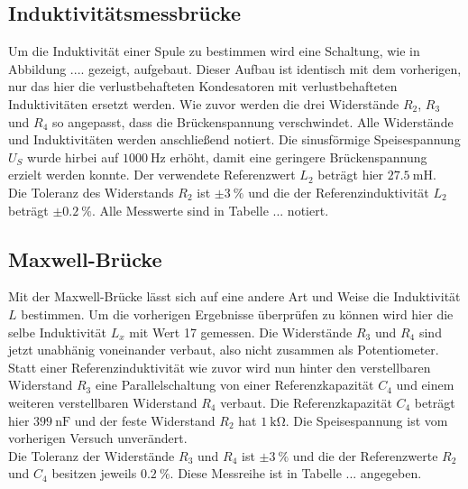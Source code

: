 \subsection{Induktivitätsmessbrücke}
Um die Induktivität einer Spule zu bestimmen wird eine Schaltung, wie in Abbildung .... gezeigt, aufgebaut. Dieser Aufbau ist identisch mit dem vorherigen, nur das hier die verlustbehafteten Kondesatoren mit verlustbehafteten Induktivitäten
ersetzt werden. Wie zuvor werden die drei Widerstände $R_{2}$, $R_{3}$ und $R_{4}$ so angepasst, dass die Brückenspannung verschwindet. Alle Widerstände und Induktivitäten werden anschließend notiert. Die sinusförmige Speisespannung $U_{S}$
wurde hirbei auf $\SI{1000}{\hertz}$ erhöht, damit eine geringere Brückenspannung erzielt werden konnte.
Der verwendete Referenzwert $L_{2}$ beträgt hier $\SI{27.5}{\milli\henry}$. 
\\
\newline
Die Toleranz des Widerstands $R_{2}$ ist $\pm\SI{3}{\percent}$ und die der Referenzinduktivität $L_{2}$ beträgt $\pm\SI{0.2}{\percent}$.
Alle Messwerte sind in Tabelle ... notiert.

\subsection{Maxwell-Brücke}
Mit der Maxwell-Brücke lässt sich auf eine andere Art und Weise die Induktivität $L$ bestimmen. Um die vorherigen Ergebnisse überprüfen zu können wird hier die selbe Induktivität $L_{x}$ mit Wert 17 gemessen. Die Widerstände $R_{3}$ und $R_{4}$ sind
jetzt unabhänig voneinander verbaut, also nicht zusammen als Potentiometer. Statt einer Referenzinduktivität wie zuvor wird nun hinter den verstellbaren Widerstand $R_{3}$ eine Parallelschaltung von einer Referenzkapazität $C_{4}$ und einem 
weiteren verstellbaren Widerstand $R_{4}$ verbaut. Die Referenzkapazität $C_{4}$ beträgt hier $\SI{399}{\nano\farad}$ und der feste Widerstand $R_{2}$ hat $\SI{1}{\kilo\ohm}$. Die Speisespannung ist vom vorherigen Versuch unverändert.
\\
\newline
Die Toleranz der Widerstände $R_{3}$ und $R_{4}$ ist $\pm\SI{3}{\percent}$ und die der Referenzwerte $R_{2}$ und $C_{4}$ besitzen jeweils $\SI{0.2}{\percent}$.
Diese Messreihe ist in Tabelle ... angegeben.

